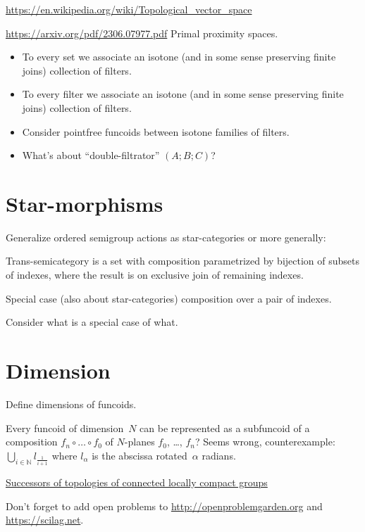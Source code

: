 \documentclass{amsart}
\begin{document}
\url{https://en.wikipedia.org/wiki/Topological_vector_space}

\url{https://arxiv.org/pdf/2306.07977.pdf} Primal proximity spaces.

\begin{itemize}
\item To every set we associate an isotone (and in some sense preserving finite joins) collection of filters.
\item To every filter we associate an isotone (and in some sense preserving finite joins) collection of filters.
\item Consider pointfree funcoids between isotone families of filters.
\item What's about ``double-filtrator'' $(A;B;C)$?
\end{itemize}

\section{Star-morphisms}

Generalize ordered semigroup actions as star-categories or more generally:

Trans-semicategory is a set with composition parametrized by bijection of subsets of indexes, where the result is on exclusive join of remaining indexes.

Special case (also about star-categories) composition over a pair of indexes.

Consider what is a special case of what.

\section{Dimension}

Define dimensions of funcoids.

Every funcoid of dimension~$N$ can be represented as
a subfuncoid of a composition $f_n\circ\dots\circ f_0$ of $N$-planes
$f_0$, \dots, $f_n$? Seems wrong, counterexample:
$\bigcup_{i\in\mathbb{N}} l_{\frac{1}{i+1}}$ where $l_\alpha$ is the
abscissa rotated~$\alpha$ radians.

\href{https://www.researchgate.net/publication/382445556_Successors_of_topologies_of_connected_locally_compact_groups}{Successors of topologies of connected locally compact groups}

Don't forget to add open problems to
\url{http://openproblemgarden.org} and
\url{https://scilag.net}.



\end{document}
